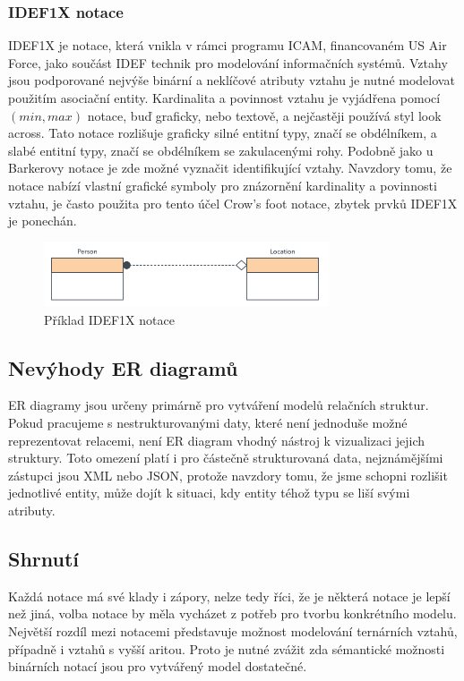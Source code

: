 \documentclass[czech,bachelor,public,dept460,male,oneside]{diploma}
\begin{document}
	\subsubsection{IDEF1X notace} \label{idef1x}
	IDEF1X je notace, která vnikla v rámci programu ICAM, financovaném US Air Force, jako součást IDEF technik pro modelování informačních systémů. Vztahy jsou podporované nejvýše binární a neklíčové atributy vztahu je nutné modelovat použitím asociační entity. Kardinalita a povinnost vztahu je vyjádřena pomocí $(min, max)$ notace, buď graficky, nebo textově, a nejčastěji používá styl look across. Tato notace rozlišuje graficky silné entitní typy, značí se obdélníkem, a slabé entitní typy, značí se obdélníkem se zakulacenými rohy. Podobně jako u Barkerovy notace je zde možné vyznačit identifikující vztahy. Navzdory tomu, že notace nabízí vlastní grafické symboly pro znázornění kardinality a povinnosti vztahu, je často použita pro tento účel Crow's foot notace, zbytek prvků IDEF1X je ponechán.
	
	\begin{figure}[!h]
		\centering
		\includegraphics[width=0.75\textwidth]{Figures/NotationExIDEF1X}
		\caption[Příklad IDEF1X notace]{Příklad IDEF1X notace \cite{whatIsERD}}
	\end{figure}
	
	\subsection{Nevýhody ER diagramů}
	ER diagramy jsou určeny primárně pro vytváření modelů relačních struktur. Pokud pracujeme s nestrukturovanými daty, které není jednoduše možné reprezentovat relacemi, není ER diagram vhodný nástroj k vizualizaci jejich struktury. Toto omezení platí i pro částečně strukturovaná data, nejznámějšími zástupci jsou XML nebo JSON, protože navzdory tomu, že jsme schopni rozlišit jednotlivé entity, může dojít k situaci, kdy entity téhož typu se liší svými atributy. 
	
	\subsection{Shrnutí}
	Každá notace má své klady i zápory, nelze tedy říci, že je některá notace je lepší než jiná, volba notace by měla vycházet z potřeb pro tvorbu konkrétního modelu. Největší rozdíl mezi notacemi představuje možnost modelování ternárních vztahů, případně i vztahů s vyšší aritou. Proto je nutné zvážit zda sémantické možnosti binárních notací jsou pro vytvářený model dostatečné. 
	
\end{document}

